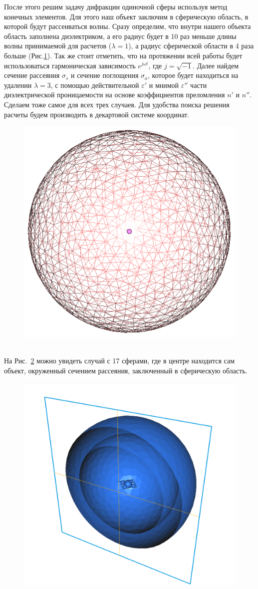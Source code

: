 После этого решим задачу дифракции одиночной сферы используя метод конечных элементов. Для этого наш объект заключим в сферическую область, в которой будут рассеиваться волны. Сразу определим, что внутри нашего объекта область заполнена диэлектриком, а его радиус будет в 10 раз меньше длины волны принимаемой для расчетов ($ \lambda = 1 $), а радиус сферической области в 4 раза больше (Рис.\ref{fig:ces1}). Так же стоит отметить, что на протяжении всей работы будет использоваться гармоническая зависимость $ e^{j \omega t} $, где $ j = \sqrt{-1} $. Далее найдем сечение рассеяния $ \sigma_s $ и сечение поглощения $ \sigma_a $, которое будет находиться на удалении $ \lambda = 3 $, с помощью действительной $ \varepsilon' $ и мнимой $ \varepsilon'' $ части диэлектрической проницаемости на основе коэффициентов преломления $ n' $ и $ n'' $. Сделаем тоже самое для всех трех случаев.  Для удобства поиска решения расчеты будем производить в декартовой системе координат. \\
\begin{figure}[h!]
	\centering
	\includegraphics[width=0.4\linewidth]{ces1}
	\caption{}
	\label{fig:ces1}
\end{figure} \\
\newpage
На Рис.~\ref{fig:3td_scattererAndOuterSpheres} можно увидеть случай с 17 сферами, где в центре находится сам объект, окруженный сечением рассеяния, заключенный в сферическую область.\\
\begin{figure}[h!]
	\centering
	\includegraphics[width=0.6\linewidth]{3td_scattererAndOuterSpheres}
	\caption{}
	\label{fig:3td_scattererAndOuterSpheres}
\end{figure} \\
